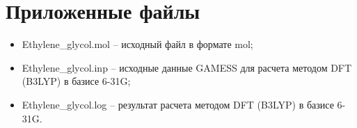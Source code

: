 \section{Приложенные файлы}
\begin{itemize}
    \item Ethylene\_glycol.mol – исходный файл в формате mol;
    \item Ethylene\_glycol.inp – исходные данные GAMESS для расчета методом DFT (B3LYP) в базисе 6-31G;
    \item Ethylene\_glycol.log – результат расчета методом DFT (B3LYP)  в базисе 6-31G.
\end{itemize}{}